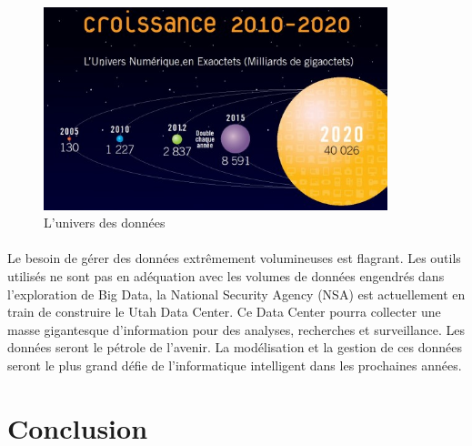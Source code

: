 \begin{figure}[H]
        \centering
                \centering
                \includegraphics[width=10cm]{datas.jpg}
               \caption{L'univers des données}

\end{figure}
\paragraph{}
Le besoin de gérer des données extrêmement volumineuses est flagrant. Les outils utilisés ne sont pas en adéquation avec les volumes de données engendrés dans l'exploration de Big Data, la National Security Agency (NSA) est actuellement en train de construire le Utah Data Center. Ce Data Center pourra collecter une masse gigantesque d'information pour des analyses, recherches et surveillance. Les données seront le pétrole de l'avenir. La modélisation et la gestion de ces données seront le plus grand défie de l'informatique intelligent dans les prochaines années. 
\newpage
\section*{Conclusion}
